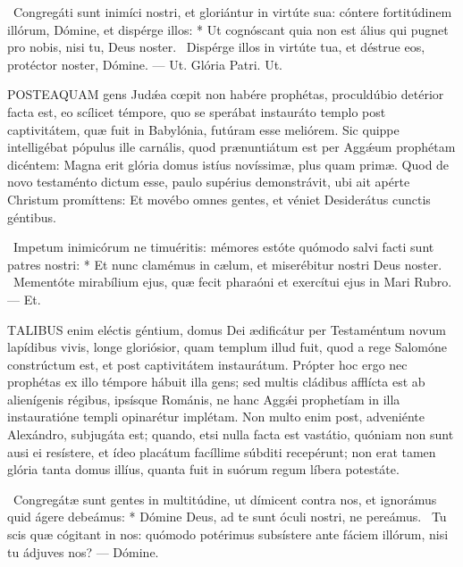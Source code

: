 \R\ Congregáti sunt inimíci nostri, et gloriántur in virtúte sua: cóntere fortitúdinem illórum, Dómine, et dispérge illos: * Ut cognóscant quia non est álius qui pugnet pro nobis, nisi tu, Deus noster. \V\ Dispérge illos in virtúte tua, et déstrue eos, protéctor noster, Dómine. — Ut. Glória Patri. Ut.




\lettrine[lines=2]{P}{OSTEAQUAM} gens Judǽa cœpit non habére prophétas, proculdúbio detérior facta est, eo scílicet témpore, quo se sperábat instauráto templo post captivitátem, quæ fuit in Babylónia, futúram esse meliórem. Sic quippe intelligébat pópulus ille carnális, quod prænuntiátum est per Aggǽum prophétam dicéntem: Magna erit glória domus istíus novíssimæ, plus quam primæ. Quod de novo testaménto dictum esse, paulo supérius demonstrávit, ubi ait apérte Christum promíttens: Et movébo omnes gentes, et véniet Desiderátus cunctis géntibus.

\R\ Impetum inimicórum ne timuéritis: mémores estóte quómodo salvi facti sunt patres nostri: * Et nunc clamémus in cælum, et miserébitur nostri Deus noster. \V\ Mementóte mirabílium ejus, quæ fecit pharaóni et exercítui ejus in Mari Rubro. — Et.


\lettrine[lines=2]{T}{ALIBUS} enim eléctis géntium, domus Dei ædificátur per Testaméntum novum lapídibus vivis, longe gloriósior, quam templum illud fuit, quod a rege Salomóne constrúctum est, et post captivitátem instaurátum. Própter hoc ergo nec prophétas ex illo témpore hábuit illa gens; sed multis cládibus afflícta est ab alienígenis régibus, ipsísque Románis, ne hanc Aggǽi prophetíam in illa instauratióne templi opinarétur implétam. Non multo enim post, adveniénte Alexándro, subjugáta est; quando, etsi nulla facta est vastátio, quóniam non sunt ausi ei resístere, et ídeo placátum facíllime súbditi recepérunt; non erat tamen glória tanta domus illíus, quanta fuit in suórum regum líbera potestáte.

\R\ Congregátæ sunt gentes in multitúdine, ut dímicent contra nos, et ignorámus quid ágere debeámus: * Dómine Deus, ad te sunt óculi nostri, ne pereámus. \V\ Tu scis quæ cógitant in nos: quómodo potérimus subsístere ante fáciem illórum, nisi tu ádjuves nos? — Dómine.

